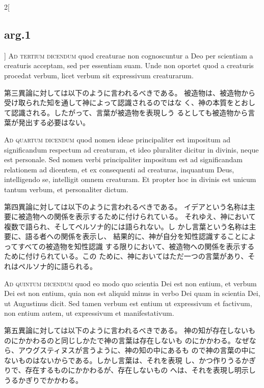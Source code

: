 \documentclass[paper=a4paper,fontsize=10pt,jafontsize=9pt,titlepage]{jlreq}
\begin{document}
\begin{paracol}{2}[\subsection{arg.1}]
{\scshape Ad tertium dicendum} quod creaturae non cognoscuntur a Deo per
scientiam a creaturis acceptam, sed per essentiam suam. Unde non
oportet quod a creaturis procedat verbum, licet verbum sit expressivum
creaturarum.

\switchcolumn

第三異論に対しては以下のように言われるべきである。
被造物は、被造物から受け取られた知を通して神によって認識されるのではな
 く、神の本質をとおして認識される。したがって、言葉が被造物を表現しう
 るとしても被造物から言葉が発出する必要はない。

\switchcolumn*[\subsection{ad.4}]

{\scshape Ad quartum dicendum} quod nomen ideae principaliter est impositum ad
significandum respectum ad creaturam, et ideo pluraliter dicitur in
divinis, neque est personale. Sed nomen verbi principaliter impositum
est ad significandam relationem ad dicentem, et ex consequenti ad
creaturas, inquantum Deus, intelligendo se, intelligit omnem
creaturam. Et propter hoc in divinis est unicum tantum verbum, et
personaliter dictum.

\switchcolumn

第四異論に対しては以下のように言われるべきである。
イデアという名称は主要に被造物への関係を表示するために付けられている。
 それゆえ、神において複数で語られ、そしてペルソナ的には語られない。し
 かし言葉という名称は主要に、語る者への関係を表示し、
 結果的に、神が自分を知性認識することによってすべての被造物を知性認識
 する限りにおいて、被造物への関係を表示するために付けられている。この
 ために、神においてはただ一つの言葉があり、それはペルソナ的に語られる。

\switchcolumn*[\subsection{ad.5}]

{\scshape Ad quintum dicendum} quod eo modo quo scientia Dei est non entium, et
verbum Dei est non entium, quia non est aliquid minus in verbo Dei
quam in scientia Dei, ut Augustinus dicit. Sed tamen verbum est entium
ut expressivum et factivum, non entium autem, ut expressivum et
manifestativum.

\switchcolumn

第五異論に対しては以下のように言われるべきである。
神の知が存在しないものにかかわるのと同じしかたで神の言葉は存在しないも
 のにかかわる。なぜなら、アウグスティヌスが言うように、神の知の中にあるも
 ので神の言葉の中にないものはないからである。しかし言葉は、それを表現
 し、かつ作りうるかぎりで、存在するものにかかわるが、存在しないもの
 へは、それを表現し明示しうるかぎりでかかわる。

\end{paracol}
\newpage
\end{document}

